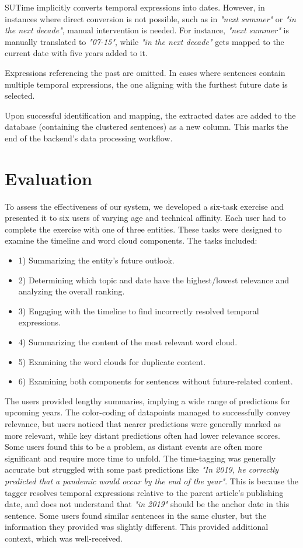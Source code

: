 \documentclass[a4paper,10pt]{report}
\begin{document}
SUTime implicitly converts temporal expressions into dates. However, in instances where direct conversion is not possible, such as in \textit{"next summer"} or \textit{"in the next decade"}, manual intervention is needed. For instance, \textit{"next summer"} is manually translated to \textit{"07-15"}, while \textit{"in the next decade"} gets mapped to the current date with five years added to it.

Expressions referencing the past are omitted. In cases where sentences contain multiple temporal expressions, the one aligning with the furthest future date is selected.

Upon successful identification and mapping, the extracted dates are added to the database (containing the clustered sentences) as a new column. This marks the end of the backend's data processing workflow.

\chapter{Evaluation}

To assess the effectiveness of our system, we developed a six-task exercise and presented it to six users of varying age and technical affinity. Each user had to complete the exercise with one of three entities. These tasks were designed to examine the timeline and word cloud components. The tasks included: 
\begin{itemize}
  \item 1) Summarizing the entity's future outlook.
  \item 2) Determining which topic and date have the highest/lowest relevance and analyzing the overall ranking.
  \item 3) Engaging with the timeline to find incorrectly resolved temporal expressions.
  \item 4) Summarizing the content of the most relevant word cloud.
  \item 5) Examining the word clouds for duplicate content.
  \item 6) Examining both components for sentences without future-related content.
\end{itemize}

The users provided lengthy summaries, implying a wide range of predictions for upcoming years. The color-coding of datapoints managed to successfully convey relevance, but users noticed that nearer predictions were generally marked as more relevant, while key distant predictions often had lower relevance scores. Some users found this to be a problem, as distant events are often more significant and require more time to unfold. The time-tagging was generally accurate but struggled with some past predictions like \textit{"In 2019, he correctly predicted that a pandemic would occur by the end of the year"}. This is because the tagger resolves temporal expressions relative to the parent article's publishing date, and does not understand that \textit{"in 2019"} should be the anchor date in this sentence. Some users found similar sentences in the same cluster, but the information they provided was slightly different. This provided additional context, which was well-received.
\end{document}
